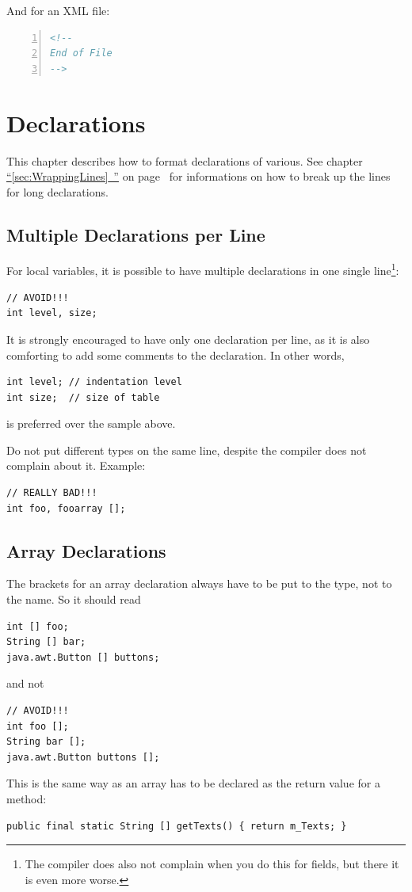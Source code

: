 \documentclass[11pt,a4paper, titlepage, parskip=half, headsepline, footsepline, cleardoublepage=current, headheight=1cm]{scrbook}
\newcommand*{\tqfullvref}[1]{\hyperref[{#1}]{“\ref*{#1}~\nameref*{#1}”} on page~\pageref{#1}}
\begin{document}
And for an XML file:
\begin{lstlisting}[numbers=left,language=XML,caption={Closing Comment XML}]
<!--
End of File
-->
\end{lstlisting}


\section{Declarations}
This chapter describes how to format declarations of various. See chapter \tqfullvref{sec:WrappingLines} for informations on how to break up the lines for long declarations.

\subsection{Multiple Declarations per Line}
For local variables, it is possible to have multiple declarations in one single line\footnote{The compiler does also not complain when you do this for fields, but there it is even more worse.}:
\begin{lstlisting}
// AVOID!!!
int level, size;
\end{lstlisting}

It is strongly encouraged to have only one declaration per line, as it is also comforting to add some comments to the declaration. In other words, 
\begin{lstlisting}
int level; // indentation level
int size;  // size of table
\end{lstlisting}

is preferred over the sample above.

Do not put different types on the same line, despite the compiler does not complain about it. Example:
\begin{lstlisting}
// REALLY BAD!!!
int foo, fooarray [];
\end{lstlisting}

\subsection{Array Declarations}
The brackets for an array declaration always have to be put to the type, not to the name. So it should read
\begin{lstlisting}
int [] foo;
String [] bar;
java.awt.Button [] buttons;
\end{lstlisting}
and not
\begin{lstlisting}
// AVOID!!!
int foo [];
String bar [];
java.awt.Button buttons [];
\end{lstlisting}
This is the same way as an array has to be declared as the return value for a method:
\begin{lstlisting}
public final static String [] getTexts() { return m_Texts; }
\end{lstlisting}
\end{document}
